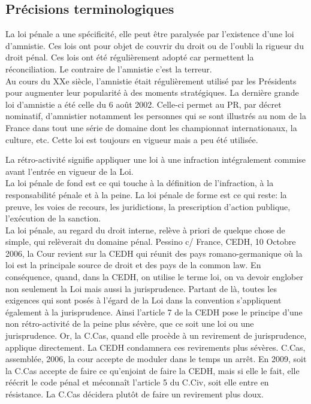 \documentclass[10pt, a4paper, openany]{book}
\begin{document}
\subsection{Précisions terminologiques}

La loi pénale a une spécificité, elle peut être paralysée par l'existence d'une loi d'amnistie. Ces lois ont pour objet de couvrir du droit ou de l'oubli la rigueur du droit pénal. Ces lois ont été régulièrement adopté car permettent la réconciliation. Le contraire de l'amnistie c'est la terreur. \\
Au cours du XXe siècle, l'amnistie était régulièrement utilisé par les Présidents pour augmenter leur popularité à des moments stratégiques. La dernière grande loi d'amnistie a été celle du 6 août 2002. Celle-ci permet au PR, par décret nominatif, d'amnistier notamment les personnes qui se sont illustrés au nom de la France dans tout une série de domaine dont les championnat internationaux, la culture, etc. Cette loi est toujours en vigueur mais a peu été utilisée.


La rétro-activité signifie appliquer une loi à une infraction intégralement commise avant l'entrée en vigueur de la Loi. \\
La loi pénale de fond est ce qui touche à la définition de l'infraction, à la responsabilité pénale et à la peine. La loi pénale de forme est ce qui reste: la preuve, les voies de recours, les juridictions, la prescription d'action publique, l'exécution de la sanction. \\
La loi pénale, au regard du droit interne, relève à priori de quelque chose de simple, qui relèverait du domaine pénal. Pessino c/ France, CEDH, 10 Octobre 2006, la Cour revient sur la CEDH qui réunit des pays romano-germanique où la loi est la principale source de droit et des pays de la common law. En conséquence, quand, dans la CEDH, on utilise le terme loi, on va devoir englober non seulement la Loi mais aussi la jurisprudence. Partant de là, toutes les exigences qui sont posés à l'égard de la Loi dans la convention s'appliquent également à la jurisprudence. Ainsi l'article 7 de la CEDH pose le principe d'une non rétro-activité de la peine plus sévère, que ce soit une loi ou une jurisprudence. Or, la C.Cas, quand elle procède à un revirement de jurisprudence, applique directement. La CEDH condamnera ces revirements plus sévères. C.Cas, assemblée, 2006, la cour accepte de moduler dans le temps un arrêt. En 2009, soit la C.Cas accepte de faire ce qu'enjoint de faire la CEDH, mais si elle le fait, elle réécrit le code pénal et méconnaît l'article 5 du C.Civ, soit elle entre en résistance. La C.Cas décidera plutôt de faire un revirement plus doux. 
\end{document}
